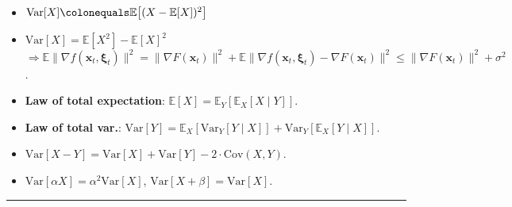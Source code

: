 \documentclass[8pt,a4paper]{extarticle}
\newcommand{\lft}{\mathopen{}\mathclose\bgroup\left}
\newcommand{\rgt}{\aftergroup\egroup\right}
\newcommand{\E}{\mathbb{E}}
\newcommand{\Var}{\mathrm{Var}}
\renewcommand{\vec}[1]{\bm{#1}}
\newenvironment{topic}[1]
{\textbf{\sffamily \colorbox{black}{\rlap{\textbf{\textcolor{white}{#1}}}\hspace{\linewidth}\hspace{-2\fboxsep}}} \\ \vspace{0.2cm}}
{}
\begin{document}
\begin{multicols*}{2}
    \begin{topic}{Expectation and variance for SGD}
        \begin{itemize}
            \item $\Var[X] \colonequals \E\lft[ (X - \E[X])^2 \rgt]$
            \item $\Var[X] = \E[X^2] - \E[X]^2$ \\ $\Rightarrow \E \| \nabla f(\vec{x}_t, \vec{\xi}_t) \|^2 = \| \nabla F(\vec{x}_t) \|^2 + \E \| \nabla f(\vec{x}_t, \vec{\xi}_t) - \nabla F(\vec{x}_t) \|^2 \leq \| \nabla F(\vec{x}_t) \|^2 + \sigma^2$.
            \item \textbf{Law of total expectation}: $\E[X] = \E_Y[\E_X[X \mid Y]]$.
            \item \textbf{Law of total var.}: $\Var[Y] = \E_X[\Var_Y[Y \mid X]] + \Var_Y[\E_X[Y \mid X]]$.
            \item $\Var[X-Y] = \Var[X] + \Var[Y] - 2 \cdot \mathrm{Cov}(X, Y)$.
            \item $\Var[\alpha X] = \alpha^2 \Var[X]$, $\Var[X + \beta] = \Var[X]$.
        \end{itemize}
    \end{topic}

    \vspace{0.2cm}
    \hrule


\end{multicols*}
\end{document}
